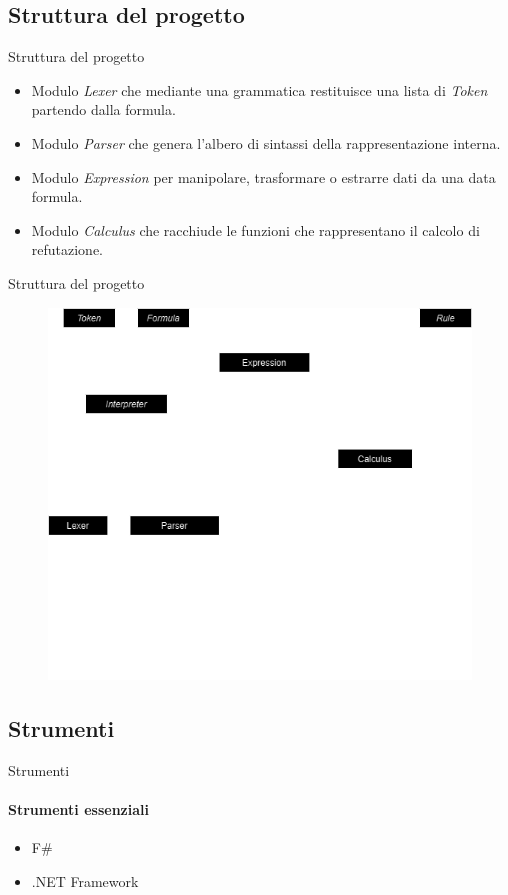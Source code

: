\documentclass{beamer}
\begin{document}
\begin{darkframes}
    \subsection{Struttura del progetto}
    \begin{frame}{Struttura del progetto}
        \begin{itemize}
            \item Modulo \textit{Lexer} che mediante una grammatica restituisce una lista di \textit{Token} partendo dalla formula.
            \item Modulo \textit{Parser} che genera l'albero di sintassi della rappresentazione interna.
            \item Modulo \textit{Expression} per manipolare, trasformare o estrarre dati da una data formula.
            \item Modulo \textit{Calculus} che racchiude le funzioni che rappresentano il calcolo di refutazione.
        \end{itemize}
    \end{frame}

    \begin{frame}{Struttura del progetto}
        \begin{figure}[h]
            \includegraphics[scale=0.4]{../images/composizione.drawio.png}
        \end{figure}
    \end{frame}

    \subsection{Strumenti}
    \begin{frame}{Strumenti}
        \framesubtitle{Strumenti essenziali}
        \begin{itemize}
            \item F\#
            \item .NET Framework
        \end{itemize}
    \end{frame}


\end{darkframes}
\end{document}
